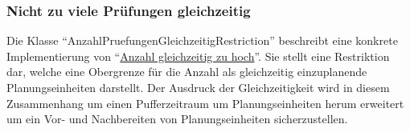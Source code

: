 \subsubsection{Nicht zu viele Prüfungen gleichzeitig}\label{subsubsec:nicht-zu-viele-pruefungen-gleichzeitig}
Die Klasse \enquote{AnzahlPruefungenGleichzeitigRestriction} beschreibt eine konkrete Implementierung von
\enquote{\hyperref[subsubsec:anzahl-gleichzeitig-zu-hoch]{Anzahl gleichzeitig zu hoch}}.
Sie stellt eine Restriktion dar, welche eine Obergrenze für die Anzahl als gleichzeitig einzuplanende
Planungseinheiten darstellt.
Der Ausdruck der Gleichzeitigkeit wird in diesem Zusammenhang um einen Pufferzeitraum
um Planungseinheiten herum erweitert um ein Vor- und Nachbereiten von Planungseinheiten sicherzustellen.
